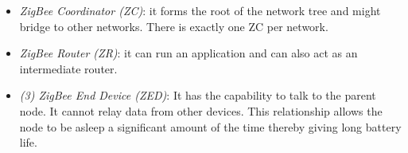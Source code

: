 \begin{itemize}
{\begin{itemize}
\item{\emph{ZigBee Coordinator (ZC)}: it forms the root of the network tree and might bridge to other networks. There is exactly one ZC per network. }
\item{\emph{ZigBee Router (ZR)}: it can run an application and can also act as an intermediate router. }
\item{\emph{(3) ZigBee End Device (ZED)}: It has the capability to talk to the parent node. It cannot relay data from other devices. This relationship allows the node to be asleep a significant amount of the time thereby giving long battery life.}
\end{itemize}
}
\end{itemize}

